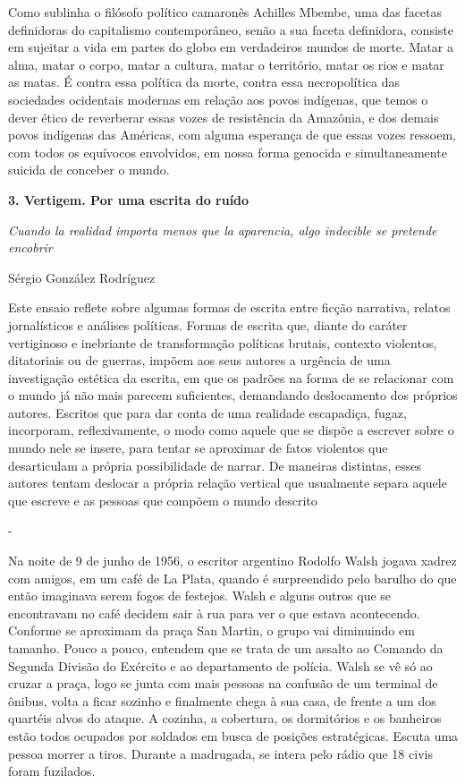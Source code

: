 Como sublinha o filósofo político camaronês Achilles Mbembe, uma das
facetas definidoras do capitalismo contemporâneo, senão a sua faceta
definidora, consiste em sujeitar a vida em partes do globo em
verdadeiros mundos de morte. Matar a alma, matar o corpo, matar a
cultura, matar o território, matar os rios e matar as matas. É contra
essa política da morte, contra essa necropolítica das sociedades
ocidentais modernas em relação aos povos indígenas, que temos o dever
ético de reverberar essas vozes de resistência da Amazônia, e dos demais
povos indígenas das Américas, com alguma esperança de que essas vozes
ressoem, com todos os equívocos envolvidos, em nossa forma genocida e
simultaneamente suicida de conceber o mundo.

\textbf{3. Vertigem. Por uma escrita do ruído}

\emph{Cuando la realidad importa menos que la aparencia, algo indecible
se pretende encobrir}

Sérgio González Rodríguez

Este ensaio reflete sobre algumas formas de escrita entre ficção
narrativa, relatos jornalísticos e análises políticas. Formas de escrita
que, diante do caráter vertiginoso e inebriante de transformação
políticas brutais, contexto violentos, ditatoriais ou de guerras, impõem
aos seus autores a urgência de uma investigação estética da escrita, em
que os padrões na forma de se relacionar com o mundo já não mais parecem
suficientes, demandando deslocamento dos próprios autores. Escritos que
para dar conta de uma realidade escapadiça, fugaz, incorporam,
reflexivamente, o modo como aquele que se dispõe a escrever sobre o
mundo nele se insere, para tentar se aproximar de fatos violentos que
desarticulam a própria possibilidade de narrar. De maneiras distintas,
esses autores tentam deslocar a própria relação vertical que usualmente
separa aquele que escreve e as pessoas que compõem o mundo descrito

-

Na noite de 9 de junho de 1956, o escritor argentino Rodolfo Walsh
jogava xadrez com amigos, em um café de La Plata, quando é surpreendido
pelo barulho do que então imaginava serem fogos de festejos. Walsh e
alguns outros que se encontravam no café decidem sair à rua para ver o
que estava acontecendo. Conforme se aproximam da praça San Martin, o
grupo vai diminuindo em tamanho. Pouco a pouco, entendem que se trata de
um assalto ao Comando da Segunda Divisão do Exército e ao departamento
de polícia. Walsh se vê só ao cruzar a praça, logo se junta com mais
pessoas na confusão de um terminal de ônibus, volta a ficar sozinho e
finalmente chega à sua casa, de frente a um dos quartéis alvos do
ataque. A cozinha, a cobertura, os dormitórios e os banheiros estão
todos ocupados por soldados em busca de posições estratégicas. Escuta
uma pessoa morrer a tiros. Durante a madrugada, se intera pelo rádio que
18 civis foram fuzilados.

